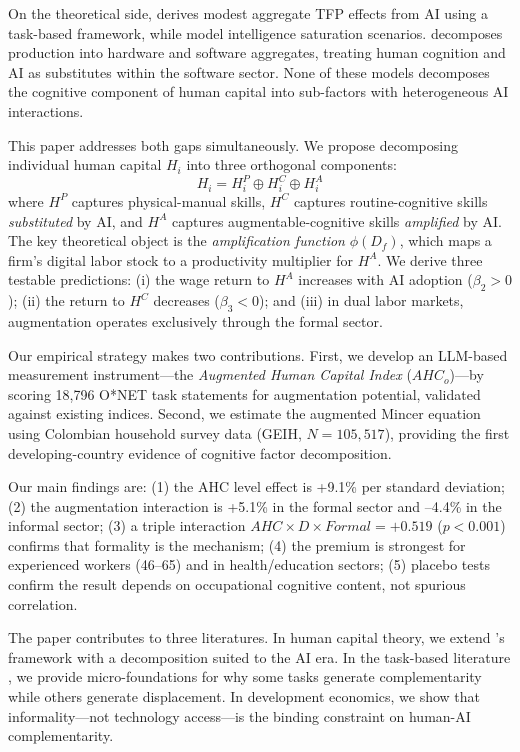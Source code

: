 \documentclass[a4paper,fleqn]{cas-dc}
\begin{document}
On the theoretical side, \citet{acemoglu2024simple} derives modest aggregate TFP effects from AI using a task-based framework, while \citet{korinek2024scenarios} model intelligence saturation scenarios. \citet{growiec2024hardware} decomposes production into hardware and software aggregates, treating human cognition and AI as substitutes within the software sector. None of these models decomposes the cognitive component of human capital into sub-factors with heterogeneous AI interactions.

This paper addresses both gaps simultaneously. We propose decomposing individual human capital $H_i$ into three orthogonal components:
\begin{equation}
H_i = H_i^P \oplus H_i^C \oplus H_i^A
\label{eq:decomposition}
\end{equation}
where $H^P$ captures physical-manual skills, $H^C$ captures routine-cognitive skills \textit{substituted} by AI, and $H^A$ captures augmentable-cognitive skills \textit{amplified} by AI. The key theoretical object is the \textit{amplification function} $\phi(D_f)$, which maps a firm's digital labor stock to a productivity multiplier for $H^A$. We derive three testable predictions: (i) the wage return to $H^A$ increases with AI adoption ($\beta_2 > 0$); (ii) the return to $H^C$ decreases ($\beta_3 < 0$); and (iii) in dual labor markets, augmentation operates exclusively through the formal sector.

Our empirical strategy makes two contributions. First, we develop an LLM-based measurement instrument---the \textit{Augmented Human Capital Index} ($AHC_o$)---by scoring 18,796 O*NET task statements for augmentation potential, validated against existing indices. Second, we estimate the augmented Mincer equation using Colombian household survey data (GEIH, $N = 105{,}517$), providing the first developing-country evidence of cognitive factor decomposition.

Our main findings are: (1) the AHC level effect is +9.1\% per standard deviation; (2) the augmentation interaction is +5.1\% in the formal sector and --4.4\% in the informal sector; (3) a triple interaction $AHC \times D \times Formal = +0.519$ ($p < 0.001$) confirms that formality is the mechanism; (4) the premium is strongest for experienced workers (46--65) and in health/education sectors; (5) placebo tests confirm the result depends on occupational cognitive content, not spurious correlation.

The paper contributes to three literatures. In human capital theory, we extend \citeauthor{becker1964human}'s framework with a decomposition suited to the AI era. In the task-based literature \citep{autor2003skill, acemoglu2022tasks}, we provide micro-foundations for why some tasks generate complementarity while others generate displacement. In development economics, we show that informality---not technology access---is the binding constraint on human-AI complementarity.
\end{document}
